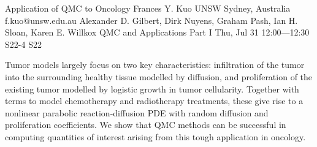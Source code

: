 \begin{talk}
  {Application of QMC to Oncology}%
  {Frances Y. Kuo}%
  {UNSW Sydney, Australia}%
  {f.kuo@unsw.edu.au}%
  {Alexander D. Gilbert, Dirk Nuyens, Graham Pash, Ian H. Sloan, Karen E. Willkox}%
  {QMC and Applications Part I}%
  {Thu, Jul 31 12:00---12:30}%
  {S22-4}%
  {S22}%
    
   
Tumor models largely focus on two key characteristics: infiltration of the tumor into the surrounding healthy tissue modelled by diffusion, and proliferation of the existing tumor modelled by logistic growth in tumor cellularity. Together with terms to model chemotherapy and radiotherapy treatments, these give rise to a nonlinear parabolic reaction-diffusion PDE with random diffusion and proliferation coefficients. We show that QMC methods can be successful in computing quantities of interest arising from this tough application in oncology.

%
%
\end{talk}

